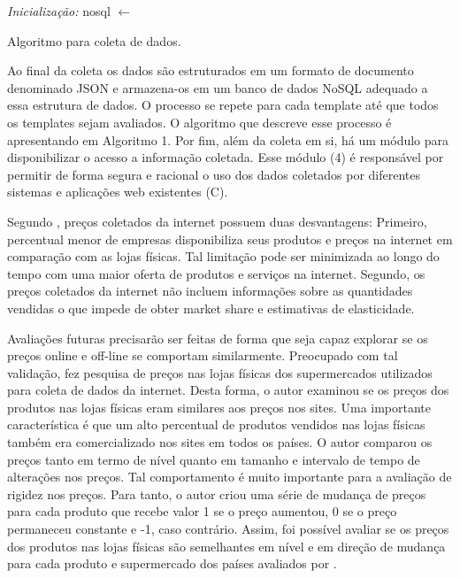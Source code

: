 \begin{algorithm}[H]
 \BlankLine
 \emph{Inicialização:} nosql $\leftarrow$ \;
 \BlankLine
 \caption{Algoritmo para coleta de dados.}
\DecMargin{1em}

Ao final da coleta os dados são estruturados em um formato de documento denominado JSON e armazena-os em um banco de dados NoSQL adequado a essa estrutura de dados. O processo se repete para cada template até que todos os templates sejam avaliados. O algoritmo que descreve esse processo é apresentando em Algoritmo 1. Por fim, além da coleta em si, há um módulo para disponibilizar o acesso a informação coletada. Esse módulo (4) é responsável por permitir de forma segura e racional o uso dos dados coletados por diferentes sistemas e aplicações web existentes (C).

Segundo \citet{cavallo2010scraped}, preços coletados da internet possuem duas desvantagens: Primeiro, percentual menor de empresas disponibiliza seus produtos e preços na internet em comparação com as lojas físicas. Tal limitação pode ser minimizada ao longo do tempo com uma maior oferta de produtos e serviços na internet. Segundo, os preços coletados da internet não incluem informações sobre as quantidades vendidas o que impede de obter market share e estimativas de elasticidade.

Avaliações futuras precisarão ser feitas de forma que seja capaz explorar se os preços online e off-line se comportam similarmente. Preocupado com tal validação, \citet{cavallo2010scraped} fez pesquisa de preços nas lojas físicas dos supermercados utilizados para coleta de dados da internet. Desta forma, o autor examinou se os preços dos produtos nas lojas físicas eram similares aos preços nos sites. Uma importante característica é que um alto percentual de produtos vendidos nas lojas físicas também era comercializado nos sites em todos os países. O autor comparou os preços tanto em termo de nível quanto em tamanho e intervalo de tempo de alterações nos preços. Tal comportamento é muito importante para a avaliação de rigidez nos preços. Para tanto, o autor criou uma série de mudança de preços para cada produto que recebe valor 1 se o preço aumentou, 0 se o preço permaneceu constante e -1, caso contrário.  Assim, foi possível avaliar se os preços dos produtos nas lojas físicas são semelhantes em nível e em direção de mudança para cada produto e supermercado dos países avaliados por \citet{cavallo2010scraped}.


\end{algorithm}
